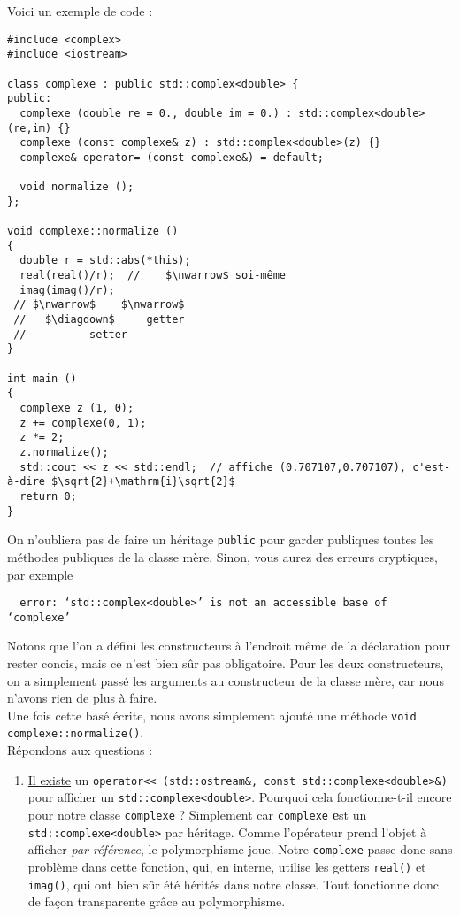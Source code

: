 \documentclass{book}
\newcommand{\inline}[1]{\texttt{#1}}
\begin{document}
\begin{correction}

Voici un exemple de code :

\begin{verbatim}
#include <complex>
#include <iostream>

class complexe : public std::complex<double> {
public:
  complexe (double re = 0., double im = 0.) : std::complex<double>(re,im) {}
  complexe (const complexe& z) : std::complex<double>(z) {}
  complexe& operator= (const complexe&) = default;

  void normalize ();
};

void complexe::normalize ()
{
  double r = std::abs(*this);
  real(real()/r);  //    $\nwarrow$ soi-même
  imag(imag()/r);
 // $\nwarrow$    $\nwarrow$
 //   $\diagdown$     getter
 //     ---- setter  
}

int main ()
{
  complexe z (1, 0);
  z += complexe(0, 1);
  z *= 2;
  z.normalize();
  std::cout << z << std::endl;  // affiche (0.707107,0.707107), c'est-à-dire $\sqrt{2}+\mathrm{i}\sqrt{2}$
  return 0;
}
\end{verbatim}

On n'oubliera pas de faire un héritage \inline{public} pour garder publiques toutes les méthodes publiques de la classe mère. Sinon, vous aurez des erreurs cryptiques, par exemple
\begin{verbatim}
  error: ‘std::complex<double>’ is not an accessible base of ‘complexe’
\end{verbatim}

Notons que l'on a défini les constructeurs à l'endroit même de la déclaration pour rester concis, mais ce n'est bien sûr pas obligatoire. Pour les deux constructeurs, on a simplement passé les arguments au constructeur de la classe mère, car nous n'avons rien de plus à faire.\\

Une fois cette basé écrite, nous avons simplement ajouté une méthode \inline{void complexe::normalize()}.\\

Répondons aux questions :
\begin{enumerate}

  \item \href{https://en.cppreference.com/w/cpp/numeric/complex/operator_ltltgtgt}{Il existe} un \inline{operator<< (std::ostream&, const std::complexe<double>&)} pour afficher un \inline{std::complexe<double>}. Pourquoi cela fonctionne-t-il encore pour notre classe \inline{complexe} ? Simplement car \inline{complexe} {\textbf est un} \inline{std::complexe<double>} par héritage. Comme l'opérateur prend l'objet à afficher \emph{par référence}, le polymorphisme joue. Notre \inline{complexe} passe donc sans problème dans cette fonction, qui, en interne, utilise les getters \inline{real()} et \inline{imag()}, qui ont bien sûr été hérités dans notre classe. Tout fonctionne donc de façon transparente grâce au polymorphisme.


\end{enumerate}
\end{correction}
\end{document}
